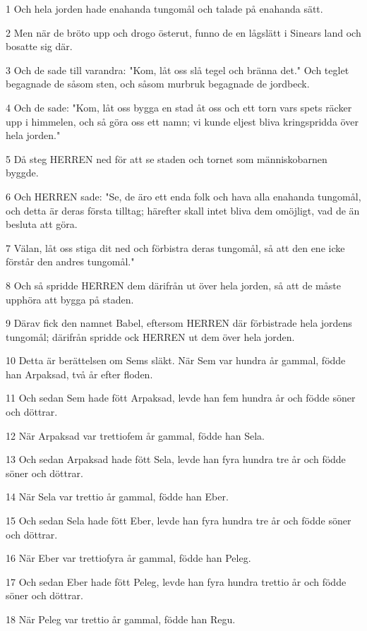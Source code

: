 \par 1 Och hela jorden hade enahanda tungomål och talade på enahanda sätt.
\par 2 Men när de bröto upp och drogo österut, funno de en lågslätt i Sinears land och bosatte sig där.
\par 3 Och de sade till varandra: "Kom, låt oss slå tegel och bränna det." Och teglet begagnade de såsom sten, och såsom murbruk begagnade de jordbeck.
\par 4 Och de sade: "Kom, låt oss bygga en stad åt oss och ett torn vars spets räcker upp i himmelen, och så göra oss ett namn; vi kunde eljest bliva kringspridda över hela jorden."
\par 5 Då steg HERREN ned för att se staden och tornet som människobarnen byggde.
\par 6 Och HERREN sade: "Se, de äro ett enda folk och hava alla enahanda tungomål, och detta är deras första tilltag; härefter skall intet bliva dem omöjligt, vad de än besluta att göra.
\par 7 Välan, låt oss stiga dit ned och förbistra deras tungomål, så att den ene icke förstår den andres tungomål."
\par 8 Och så spridde HERREN dem därifrån ut över hela jorden, så att de måste upphöra att bygga på staden.
\par 9 Därav fick den namnet Babel, eftersom HERREN där förbistrade hela jordens tungomål; därifrån spridde ock HERREN ut dem över hela jorden.
\par 10 Detta är berättelsen om Sems släkt. När Sem var hundra år gammal, födde han Arpaksad, två år efter floden.
\par 11 Och sedan Sem hade fött Arpaksad, levde han fem hundra år och födde söner och döttrar.
\par 12 När Arpaksad var trettiofem år gammal, födde han Sela.
\par 13 Och sedan Arpaksad hade fött Sela, levde han fyra hundra tre år och födde söner och döttrar.
\par 14 När Sela var trettio år gammal, födde han Eber.
\par 15 Och sedan Sela hade fött Eber, levde han fyra hundra tre år och födde söner och döttrar.
\par 16 När Eber var trettiofyra år gammal, födde han Peleg.
\par 17 Och sedan Eber hade fött Peleg, levde han fyra hundra trettio år och födde söner och döttrar.
\par 18 När Peleg var trettio år gammal, födde han Regu.
